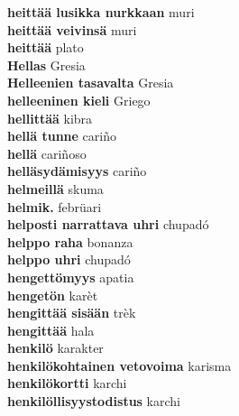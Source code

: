 \textbf{ heittää lusikka nurkkaan  } muri \\
\textbf{ heittää veivinsä  } muri \\
\textbf{ heittää  } plato \\
\textbf{ Hellas  } Gresia \\
\textbf{ Helleenien tasavalta  } Gresia \\
\textbf{ helleeninen kieli  } Griego \\
\textbf{ hellittää  } kibra \\
\textbf{ hellä tunne  } cariño \\
\textbf{ hellä  } cariñoso \\
\textbf{ helläsydämisyys  } cariño \\
\textbf{ helmeillä  } skuma \\
\textbf{ helmik.  } febrüari \\
\textbf{ helposti narrattava uhri  } chupadó \\
\textbf{ helppo raha  } bonanza \\
\textbf{ helppo uhri  } chupadó \\
\textbf{ hengettömyys  } apatia \\
\textbf{ hengetön  } karèt \\
\textbf{ hengittää sisään  } trèk \\
\textbf{ hengittää  } hala \\
\textbf{ henkilö  } karakter \\
\textbf{ henkilökohtainen vetovoima  } karisma \\
\textbf{ henkilökortti  } karchi \\
\textbf{ henkilöllisyystodistus  } karchi \\

